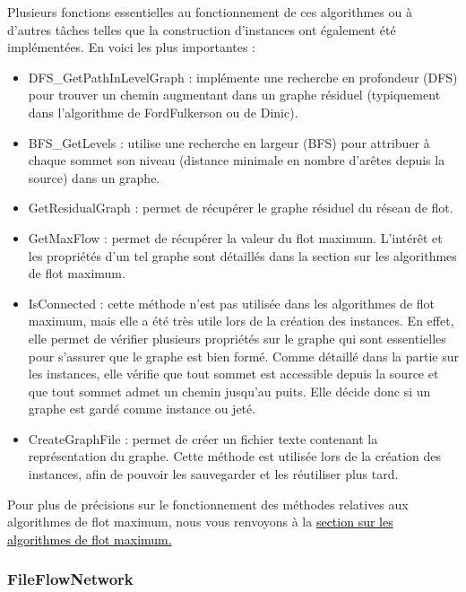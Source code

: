 \documentclass[a4paper]{article}
\begin{document}
Plusieurs fonctions essentielles au fonctionnement de ces algorithmes ou à d'autres tâches telles que la construction d'instances ont  également été implémentées. En voici les plus importantes :
\begin{itemize}
	\item \textcolor{green!60!black}{DFS\_GetPathInLevelGraph} : implémente une recherche en profondeur (DFS) pour trouver un chemin augmentant dans un graphe résiduel (typiquement dans l'algorithme de FordFulkerson ou de Dinic).
	\item \textcolor{green!60!black}{BFS\_GetLevels} : utilise une recherche en largeur (BFS) pour attribuer à chaque sommet son niveau (distance minimale en nombre d’arêtes depuis la source) dans un graphe.
	\item \textcolor{green!60!black}{GetResidualGraph} : permet de récupérer le graphe résiduel du réseau de flot.
	\item \textcolor{green!60!black}{GetMaxFlow} : permet de récupérer la valeur du flot maximum. L'intérêt et les propriétés d'un tel graphe sont détaillés dans la section sur les algorithmes de flot maximum.
	\item \textcolor{green!60!black}{IsConnected} : cette méthode n'est pas utilisée dans les algorithmes de flot maximum, mais elle a été très utile lors de la création des instances. En effet, elle permet de vérifier plusieurs propriétés sur le graphe qui sont essentielles pour s'assurer que le graphe est \og{}bien formé\fg{}. Comme détaillé dans la partie sur les instances, elle vérifie que tout sommet est accessible depuis la source et que tout sommet admet un chemin jusqu'au puits. Elle décide donc si un graphe est gardé comme instance ou jeté.
	\item \textcolor{green!60!black}{CreateGraphFile} : permet de créer un fichier texte contenant la représentation du graphe. Cette méthode est utilisée lors de la création des instances, afin de pouvoir les sauvegarder et les réutiliser plus tard.
\end{itemize}
Pour plus de précisions sur le fonctionnement des méthodes relatives aux algorithmes de flot maximum, nous vous renvoyons à la \hyperref[sec:algos]{\textcolor{black}{section sur les algorithmes de flot maximum.}}

\subsubsection{FileFlowNetwork}
\end{document}
